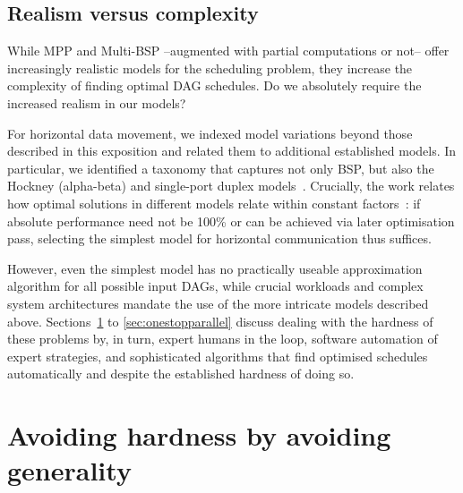 \documentclass[oneside,reqno, a4paper]{amsart}
\numberwithin{equation}{section}
\let\Oldsection\section
\renewcommand{\section}{\FloatBarrier\Oldsection}
\newcommand{\todo}[1]{{\color{red} \sf TODO: [#1]}}
\begin{document}


\subsection{Realism versus complexity}

While MPP and Multi-BSP --augmented with partial computations or not-- offer increasingly realistic models for the scheduling problem, %
they increase the complexity of finding optimal DAG schedules.
Do we absolutely require the increased realism in our models?

For horizontal data movement,
we indexed model variations beyond those described in this exposition and related them to additional established models.
In particular, we identified a taxonomy that captures not only BSP,
but also the Hockney (alpha-beta) and single-port duplex models~\cite{hockney94,ozkaya19}.
Crucially, the work relates how optimal solutions in different models relate within constant factors~\cite[Thm.~1]{BSP_DAG_opdas}:
if absolute performance need not be 100\% or can be achieved via later optimisation pass,
selecting the simplest model for horizontal communication thus suffices.

However,
even the simplest model has no practically useable approximation algorithm for all possible input DAGs,
while crucial workloads and complex system architectures mandate the use of the more intricate models described above.
Sections~\ref{sec:avoiding-hardness} to \ref{sec:onestopparallel} discuss dealing with the hardness of these problems by,
in turn,
expert humans in the loop,
software automation of expert strategies, and
sophisticated algorithms that find optimised schedules automatically and despite the established hardness of doing so.


\section{Avoiding hardness by avoiding generality}
\label{sec:avoiding-hardness}
\end{document}
